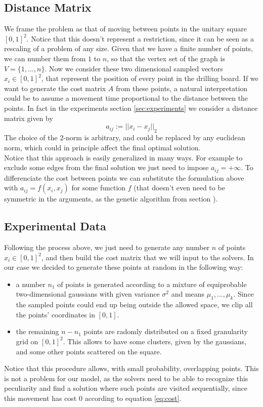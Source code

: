 \documentclass{article}
\begin{document}
\subsection*{Distance Matrix}
We frame the problem as that of moving between points in the unitary square $[0, 1]^2$. Notice that this doesn't represent a restriction, since it can be seen as a rescaling of a problem of any size. Given that we have a finite number of points, we can number them from $1$ to $n$, so that the vertex set of the graph is $V = \{ 1, \ldots, n  \}$. Now we consider these two dimensional sampled vectors $x_i \in [0, 1]^2 $, that represent the position of every point in the drilling board. If we want to generate the cost matrix $A$ from these points, a natural interpretation could be to assume a movement time proportional to the distance between the points. In fact in the experiments section \ref{sec:experiments} we consider a distance matrix given by
\begin{equation}\label{eq:cost}
a_{ij} := {|| x_i - x_j ||}_2
\end{equation} 
The choice of the 2-norm is arbitrary, and could be replaced by any euclidean norm, which could in principle affect the final optimal solution. \\
Notice that this approach is easily generalized in many ways. For example to exclude some edges from the final solution we just need to impose $a_{ij} = +\infty$. To differenciate the cost between points we can substitute the formulation above with $a_{ij} = f(x_i, x_j)$ for some function $f$ (that doesn't even need to be symmetric in the arguments, as the genetic algorithm from section ).  

\subsection*{Experimental Data}
Following the process above, we just need to generate any number $n$ of points $x_i \in [0, 1]^2 $, and then build the cost matrix that we will input to the solvers. In our case we decided to generate these points at random in the following way:
\begin{itemize}
\item a number $n_1$ of points is generated according to a mixture of equiprobable two-dimensional gaussians with given variance $\sigma^2$ and means $\mu_1, \ldots, \mu_k$. Since the sampled points could end up being outside the allowed space, we clip all the points' coordinates in $[0, 1]$. 
\item the remaining $n-n_1$ points are radomly distributed on a fixed granularity grid on  $[0, 1]^2$. This allows to have some clusters, given by the gaussians, and some other points scattered on the square. 
\end{itemize}
Notice that this procedure allows, with small probability, overlapping points. This is not a problem for our model, as the solvers need to be able to recognize this peculiarity and find a solution where such points are visited sequentially, since this movement has cost 0 according to equation \eqref{eq:cost}.
\end{document}

